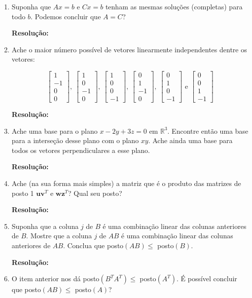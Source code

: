 \documentclass[leqno]{article}
\numberwithin{equation}{section}
\newcommand{\bR}{\mathbb{R}}
\newcommand{\bfw}{\mathbf{w}}
\newcommand{\bfv}{\mathbf{v}}
\newcommand{\bfu}{\mathbf{u}}
\newcommand{\bfz}{\mathbf{z}}
\newcommand{\bvecfour}[4]{%
    \begin{bmatrix} #1 \\ #2 \\ #3 \\ #4 \end{bmatrix}
}
\newenvironment{sol}
{
    \vspace{4mm}
    \noindent\textbf{Resolução:}
    \strut\newline
    \smallskip
    \hspace{-3.5mm}
}
{}
\begin{document}
\begin{enumerate}
    \item Suponha que $Ax = b$ e $Cx = b$ tenham as mesmas soluções (completas) para todo $b$. Podemos concluir que $A = C$?

        \begin{sol} 
        \end{sol} 

    \item Ache o maior número possível de vetores linearmente independentes dentre os vetores:

        $$\bvecfour{1}{-1}{0}{0}, \ \bvecfour{1}{0}{-1}{0}, \ \bvecfour{1}{0}{0}{-1}, \ \bvecfour{0}{1}{-1}{0}, \ \bvecfour{0}{1}{0}{-1} \mbox{ e } \bvecfour{0}{0}{1}{-1}$$

        \begin{sol} 
        \end{sol} 

    \item Ache uma base para o plano $x - 2y + 3z = 0$ em $\bR^3$. Encontre então uma base para a interseção desse plano com o plano $xy$. Ache ainda uma base para todos os vetores perpendiculares a esse plano.

        \begin{sol} 
        \end{sol} 

    \item Ache (na sua forma mais simples) a matriz que é o produto das matrizes de posto 1 $\bfu \bfv^T$ e $\bfw \bfz^T$? Qual seu posto?

        \begin{sol} 
        \end{sol} 

    \item Suponha que a coluna $j$ de $B$ é uma combinação linear das colunas anteriores de $B$. Mostre que a coluna $j$ de $AB$ é uma combinação linear das colunas anteriores de $AB$. Conclua que posto$(AB) \leq $ posto$(B)$.

        \begin{sol} 
        \end{sol} 

    \item O item anterior nos dá posto$(B^T A^T) \leq $ posto$(A^T)$. É possível concluir que posto$(AB) \leq $ posto$(A)$?


\end{enumerate}
\end{document}

